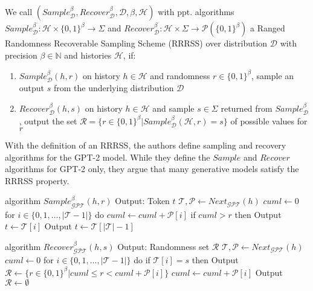 \begin{definition}
	\label{def:rrrss}
	We call 
	$(Sample_{\mathcal{D}}^\beta, Recover_{\mathcal{D}}^\beta, \mathcal{D}, \beta, \mathcal{H})$ 
	with ppt. algorithms
	$Sample_{\mathcal{D}}^\beta \colon \mathcal{H} \times \{0,1\}^\beta \rightarrow \Sigma$ 
	and 
	$Recover_{\mathcal{D}}^\beta \colon \mathcal{H} \times \Sigma \rightarrow \mathcal{P}(\{0,1\}^\beta)$ 
	a Ranged Randomness Recoverable Sampling Scheme (RRRSS) over distribution $\mathcal{D}$ with precision $\beta \in \mathbb{N}$ and histories $\mathcal{H}$, if:
	
	\begin{enumerate}
		\item $Sample_{\mathcal{D}}^\beta(h, r)$ on history $h \in \mathcal{H}$ and randomness $r \in \{0,1\}^\beta$, sample an output $s$ from the underlying distribution $\mathcal{D}$
		\item $Recover_{\mathcal{D}}^\beta(h, s)$ on history $h \in \mathcal{H}$ and sample $s \in \Sigma$ returned from $Sample_{\mathcal{D}}^\beta$, output the set $\mathcal{R} = \{ r \in \{0,1\}^\beta | Sample_{\mathcal{D}}^\beta(\mathcal{H}, r) = s \}$ of possible values for $r$
	\end{enumerate}
\end{definition}

With the definition of an RRRSS, the authors define sampling and recovery algorithms for the GPT-2 model.
While they define the $Sample$ and $Recover$ algorithms for GPT-2 only, they argue that many generative models satisfy the RRRSS property.

\begin{Pseudocode}[caption={
RRRSS Sample Algorithm for GPT, \cite{Meteor2021}.
$Sample$ produces, given a history $h$ and a value $r$, the next token sampled according to $r$ from the distribution for the next token generated by $Next_{\mathcal{GPT}}(h)$.
}]
algorithm $Sample_{\mathcal{GPT}}^\beta(	h, r)$
	Output: Token $t$
	$\mathcal{T}, \mathcal{P} \leftarrow Next_{\mathcal{GPT}}(h)$
	$cuml \leftarrow 0$
	for $i \in \{ 0, 1, \dots, | \mathcal{T} - 1 | \}$ do
		$cuml \leftarrow cuml + \mathcal{P}[i]$
		if $cuml > r$ then
			Output $t \leftarrow \mathcal{T}[i]$
	Output $t \leftarrow \mathcal{T}[|\mathcal{T}|-1]$
\end{Pseudocode}

\begin{Pseudocode}[caption={
RRRSS Recover Algorithm for GPT, \cite{Meteor2021}.
Given a history $h$ and a sample $s$, return a set of possible random values used to generate $s$ with history $h$.
}]
algorithm $Recover_{\mathcal{GPT}}^\beta(h, s)$
	Output: Randomness set $\mathcal{R}$
	$\mathcal{T}, \mathcal{P} \leftarrow Next_{\mathcal{GPT}}(h)$
	$cuml \leftarrow 0$
	for $i \in \{ 0, 1, \dots, | \mathcal{T} - 1 | \}$ do
		if $\mathcal{T}[i] = s$ then
			Output $\mathcal{R} \leftarrow \{ r \in \{ 0, 1\}^\beta | cuml \leq r < cuml + \mathcal{P}[i] \}$
		$cuml \leftarrow cuml + \mathcal{P}[i]$
	Output $\mathcal{R} \leftarrow \emptyset$
\end{Pseudocode}

